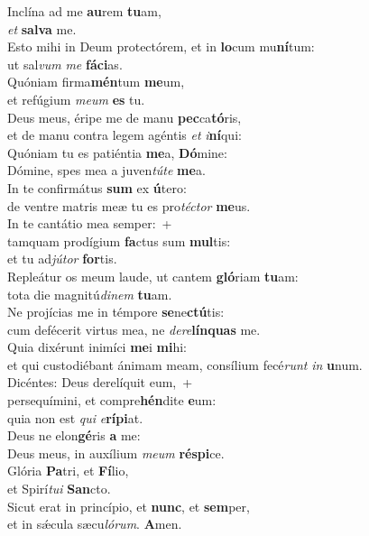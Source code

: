 \evenverse Inclína ad me \textbf{au}rem \textbf{tu}am,~\*\\
\evenverse \textit{et} \textbf{sal}\textbf{va} me.\\
\oddverse Esto mihi in Deum protectórem, et in \textbf{lo}cum mu\textbf{ní}tum:~\*\\
\oddverse ut sal\textit{vum} \textit{me} \textbf{fá}\textbf{ci}as.\\
\evenverse Quóniam firma\textbf{mén}tum \textbf{me}um,~\*\\
\evenverse et refúgium \textit{me}\textit{um} \textbf{es} tu.\\
\oddverse Deus meus, éripe me de manu \textbf{pec}ca\textbf{tó}ris,~\*\\
\oddverse et de manu contra legem agéntis \textit{et} \textit{i}\textbf{ní}qui:\\
\evenverse Quóniam tu es patiéntia \textbf{me}a, \textbf{Dó}mine:~\*\\
\evenverse Dómine, spes mea a juven\textit{tú}\textit{te} \textbf{me}a.\\
\oddverse In te confirmátus \textbf{sum} ex \textbf{ú}tero:~\*\\
\oddverse de ventre matris meæ tu es pro\textit{té}\textit{ctor} \textbf{me}us.\\
\evenverse In te cantátio mea semper:~+\\
\evenverse  tamquam prodígium \textbf{fa}ctus sum \textbf{mul}tis:~\*\\
\evenverse et tu ad\textit{jú}\textit{tor} \textbf{for}tis.\\
\oddverse Repleátur os meum laude, ut cantem \textbf{gló}riam \textbf{tu}am:~\*\\
\oddverse tota die magnitú\textit{di}\textit{nem} \textbf{tu}am.\\
\evenverse Ne projícias me in témpore \textbf{se}ne\textbf{ctú}tis:~\*\\
\evenverse cum defécerit virtus mea, ne \textit{de}\textit{re}\textbf{lín}\textbf{quas} me.\\
\oddverse Quia dixérunt inimíci \textbf{me}i \textbf{mi}hi:~\*\\
\oddverse et qui custodiébant ánimam meam, consílium fecé\textit{runt} \textit{in} \textbf{u}num.\\
\evenverse Dicéntes: Deus derelíquit eum,~+\\
\evenverse  persequímini, et compre\textbf{hén}dite \textbf{e}um:~\*\\
\evenverse quia non est \textit{qui} \textit{e}\textbf{rí}\textbf{pi}at.\\
\oddverse Deus ne elon\textbf{gé}ris \textbf{a} me:~\*\\
\oddverse Deus meus, in auxílium \textit{me}\textit{um} \textbf{ré}\textbf{spi}ce.\\
\evenverse Glória \textbf{Pa}tri, et \textbf{Fí}lio,~\*\\
\evenverse et Spirí\textit{tu}\textit{i} \textbf{San}cto.\\
\oddverse Sicut erat in princípio, et \textbf{nunc}, et \textbf{sem}per,~\*\\
\oddverse et in sǽcula sæcu\textit{ló}\textit{rum}. \textbf{A}men.\\
